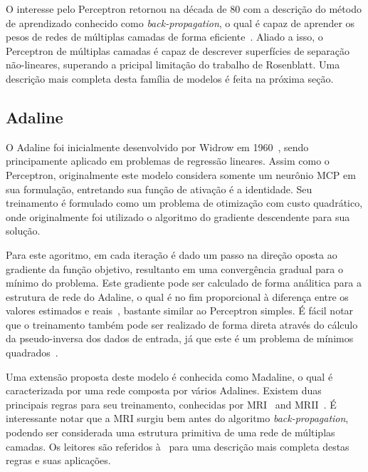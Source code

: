 \documentclass[conference]{IEEEtran}
\begin{document}
	O interesse pelo Perceptron retornou na década de 80 com a descrição do método de aprendizado conhecido como \textit{back-propagation}, o qual é capaz de aprender os pesos de redes de múltiplas camadas de forma eficiente~\cite{rumelhart1985learning}. Aliado a isso, o Perceptron de múltiplas camadas é capaz de descrever superfícies de separação não-lineares, superando a pricipal limitação do trabalho de Rosenblatt. Uma descrição mais completa desta família de modelos é feita na próxima seção.

	\subsection{Adaline}
	O Adaline foi inicialmente desenvolvido por Widrow em 1960~\cite{widrow1960adaptive}, sendo principamente aplicado em problemas de regressão lineares. Assim como o Perceptron, originalmente este modelo considera somente um neurônio MCP em sua formulação, entretando sua função de ativação é a identidade. Seu treinamento é formulado como um problema de otimização com custo quadrático, onde originalmente foi utilizado o algoritmo do gradiente descendente para sua solução. 
	
	Para este agoritmo, em cada iteração é dado um passo na direção oposta ao gradiente da função objetivo, resultanto em uma convergência gradual para o mínimo do problema. Este gradiente pode ser calculado de forma análitica para a estrutura de rede do Adaline, o qual é no fim proporcional à diferença entre os valores estimados e reais~\cite{widrow1960adaptive}, bastante similar ao Perceptron simples. É fácil notar que o treinamento também pode ser realizado de forma direta através do cálculo da  pseudo-inversa dos dados de entrada, já que este é um problema de mínimos quadrados~\cite{haykin2007neural}.
	
	Uma extensão proposta deste modelo é conhecida como Madaline, o qual é caracterizada por uma rede composta por vários Adalines. Existem duas principais regras para seu treinamento, conhecidas por MRI~\cite{widrow1962generalization} and MRII~\cite{winter1988madaline}. É interessante notar que a MRI surgiu bem antes do algoritmo \textit{back-propagation}, podendo ser considerada uma estrutura primitiva de uma rede de múltiplas camadas. Os leitores são referidos à~\cite{widrow199030} para uma descrição mais completa destas regras e suas aplicações.
	
	   
	
	 
	
		
\end{document}
